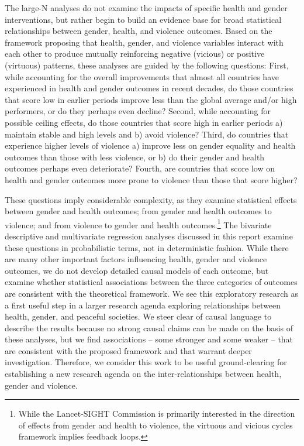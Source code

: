 \documentclass[12pt]{article}
\begin{document}
The large-N analyses do not examine the impacts of specific health and gender interventions, but rather begin to build an evidence base for broad statistical relationships between gender, health, and violence outcomes.
Based on the framework proposing that health, gender, and violence variables interact with each other to produce mutually reinforcing negative (vicious) or positive (virtuous) patterns, these analyses are guided by the following questions:
First, while accounting for the overall improvements that almost all countries have experienced in health and gender outcomes in recent decades, do those countries that score low in earlier periods improve less than the global average and/or high performers, or do they perhaps even decline?
Second, while accounting for possible ceiling effects, do those countries that score high in earlier periods a) maintain stable and high levels and b) avoid violence?
Third, do countries that experience higher levels of violence a) improve less on gender equality and health outcomes than those with less violence, or b) do their gender and health outcomes perhaps even deteriorate?
Fourth, are countries that score low on health and gender outcomes more prone to violence than those that score higher?

These questions imply considerable complexity, as they examine statistical effects between gender and health outcomes; from gender and health outcomes to violence; and from violence to gender and health outcomes.\footnote{
While the Lancet-SIGHT Commission is primarily interested in the direction of effects from gender and health to violence, the virtuous and vicious cycles framework implies feedback loops.}
The bivariate descriptive and multivariate regression analyses discussed in this report examine these questions in probabilistic terms, not in deterministic fashion.
While there are many other important factors influencing health, gender and violence outcomes, we do not develop detailed causal models of each outcome, but examine whether statistical associations between the three categories of outcomes are consistent with the theoretical framework. We see this exploratory research as a first useful step in a larger research agenda exploring relationships between health, gender, and peaceful societies. We steer clear of causal language to describe the results because no strong causal claims can be made on the basis of these analyses, but we find associations -- some stronger and some weaker -- that are consistent with the proposed framework and that warrant deeper investigation. Therefore, we consider this work to be useful ground-clearing for establishing a new research agenda on the inter-relationships between health, gender and violence.
\end{document}
